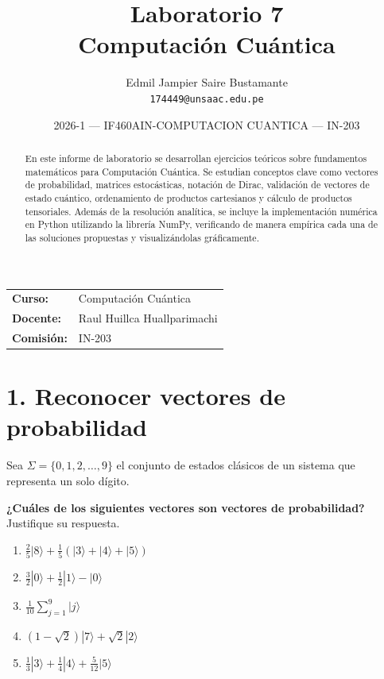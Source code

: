\documentclass[12pt,a4paper]{article}
\title{\textbf{Laboratorio 7}\\
\large Computación Cuántica}
\author{Edmil Jampier Saire Bustamante\\
\texttt{174449@unsaac.edu.pe}}
\date{2026-1 --- IF460AIN-COMPUTACION CUANTICA --- IN-203}
\begin{document}
\maketitle
\thispagestyle{empty}

\begin{center}
\begin{tabular}{ll}
\textbf{Curso:} & Computación Cuántica \\
\textbf{Docente:} & Raul Huillca Huallparimachi \\
\textbf{Comisión:} & IN-203
\end{tabular}
\end{center}

\vspace{1em}

\begin{abstract}
En este informe de laboratorio se desarrollan ejercicios teóricos sobre fundamentos matemáticos para Computación Cuántica. Se estudian conceptos clave como vectores de probabilidad, matrices estocásticas, notación de Dirac, validación de vectores de estado cuántico, ordenamiento de productos cartesianos y cálculo de productos tensoriales. Además de la resolución analítica, se incluye la implementación numérica en Python utilizando la librería NumPy, verificando de manera empírica cada una de las soluciones propuestas y visualizándolas gráficamente.
\end{abstract}

\tableofcontents
\newpage

\section{1. Reconocer vectores de probabilidad}

Sea $\Sigma = \{0,1,2,\ldots,9\}$ el conjunto de estados clásicos de un sistema que representa un solo dígito.

\textbf{¿Cuáles de los siguientes vectores son vectores de probabilidad?} Justifique su respuesta.

\begin{enumerate}
    \item $\frac{2}{5}|8\rangle+\frac{1}{5}\left(|3\rangle+|4\rangle+|5\rangle\right)$
    \item $\frac{3}{2}|0\rangle+\frac{1}{2}|1\rangle-|0\rangle$
    \item $\frac{1}{10}\sum_{j=1}^{9}|j\rangle$
    \item $(1-\sqrt{2})|7\rangle+\sqrt{2}|2\rangle$
    \item $\frac{1}{3}|3\rangle+\frac{1}{4}|4\rangle+\frac{5}{12}|5\rangle$
\end{enumerate}
\end{document}
